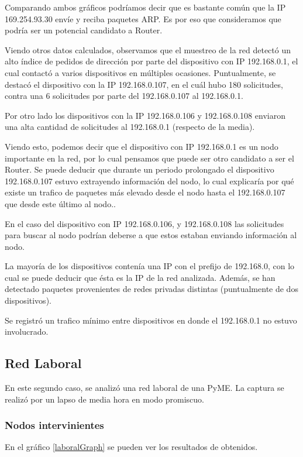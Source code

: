 Comparando ambos gr\'aficos podr\'iamos decir que es bastante com\'un que la IP 169.254.93.30 env\'ie y reciba paquetes ARP. Es por eso que consideramos que podr\'ia ser un potencial candidato a Router.

Viendo otros datos calculados, observamos que el muestreo de la red detect\'o un alto \'indice de pedidos de direcci\'on por parte del dispositivo con IP 192.168.0.1, el cual contact\'o a varios dispositivos en m\'ultiples ocasiones. Puntualmente, se destac\'o el dispositivo con la IP 192.168.0.107, en el cu\'al hubo 180 solicitudes, contra una 6 solicitudes por parte del 192.168.0.107 al 192.168.0.1.

Por otro lado los dispositivos con la IP 192.168.0.106 y 192.168.0.108 enviaron una alta cantidad de solicitudes al  192.168.0.1 (respecto de la media).

Viendo esto, podemos decir que el dispositivo con IP 192.168.0.1 es un nodo importante en la red, por lo cual pensamos que puede ser otro candidato a ser el Router. Se puede deducir que durante un periodo prolongado el dispositivo 192.168.0.107 estuvo extrayendo informaci\'on del nodo, lo cual explicar\'ia por qu\'e existe un trafico de paquetes m\'as elevado desde el nodo hasta el  192.168.0.107 que desde este \'ultimo al nodo..

En el caso del dispositivo con IP 192.168.0.106, y 192.168.0.108 las solicitudes para buscar al nodo podr\'ian deberse a que estos estaban enviando informaci\'on al nodo.

La mayor\'ia de los dispositivos conten\'ia una IP con el prefijo de 192.168.0, con lo cual se puede deducir que \'esta es la IP de la red analizada. Adem\'as, se han detectado paquetes provenientes de redes privadas distintas (puntualmente de dos dispositivos).

Se registr\'o un trafico m\'inimo entre dispositivos en donde el 192.168.0.1 no estuvo involucrado.

\newpage
\subsection{Red Laboral}

En este segundo caso, se analiz\'o una red laboral de una PyME. La captura se realiz\'o por un lapso de media hora en modo promiscuo.

\subsubsection{Nodos intervinientes}
En el gr\'afico \ref{laboralGraph} se pueden ver los resultados de obtenidos.

